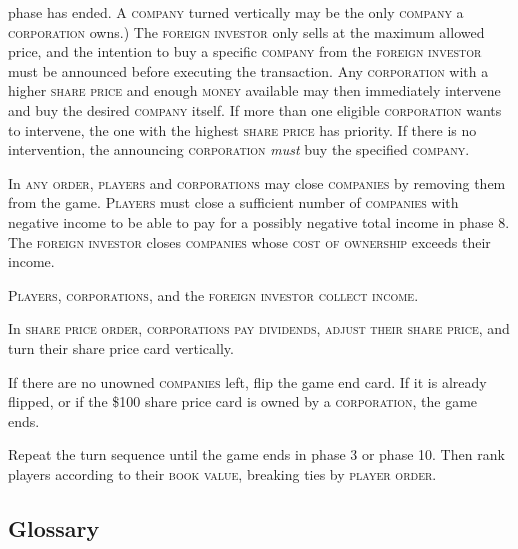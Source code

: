 \documentclass[11pt,a4paper]{article}
\newcounter{itemcounter}
\newenvironment{my_enumerate}
{\begin{list}{\arabic{itemcounter}.}
  {\usecounter{itemcounter}\leftmargin=1.8em}
  \setlength{\itemsep}{1pt}
  \setlength{\parskip}{0pt}
  \setlength{\parsep}{0pt}
}
{\end{list}}
\begin{document}
\begin{multicols}{2}
{\begin{my_enumerate}
  phase has ended. A \textsc{company} turned vertically may be the
  only \textsc{company} a \textsc{corporation} owns.) The
  \textsc{foreign investor} only sells at the maximum allowed price,
  and the intention to buy a specific \textsc{company} from the
  \textsc{foreign investor} must be announced before executing the
  transaction. Any \textsc{corporation} with a higher \textsc{share
    price} and enough \textsc{money} available may then immediately
  intervene and buy the desired \textsc{company} itself. If more than
  one eligible \textsc{corporation} wants to intervene, the one with
  the highest \textsc{share price} has priority. If there is no
  intervention, the announcing \textsc{corporation} \emph{must} buy
  the specified \textsc{company}.
\item In \textsc{any order}, \textsc{players} and
  \textsc{corporations} may close \textsc{companies} by removing them
  from the game. \textsc{Players} must close a sufficient number of
  \textsc{companies} with negative income to be able to pay for a
  possibly negative total income in phase 8. The \textsc{foreign investor}
  closes \textsc{companies} whose \textsc{cost of ownership} exceeds
  their income.
\item \textsc{Players}, \textsc{corporations}, and the \textsc{foreign
    investor} \textsc{collect income}.
\item In \textsc{share price order}, \textsc{corporations} \textsc{pay
    dividends}, \textsc{adjust their share price}, and turn their
  share price card vertically.
\item If there are no unowned \textsc{companies} left, flip the game
  end card. If it is already flipped, or if the \$100 share price card
  is owned by a \textsc{corporation}, the game ends.
\end{my_enumerate}

Repeat the turn sequence until the game ends in phase 3 or phase
10. Then rank players according to their \textsc{book value},
breaking ties by \textsc{player order}.

\subsection*{Glossary}

}
\end{multicols}
\end{document}
